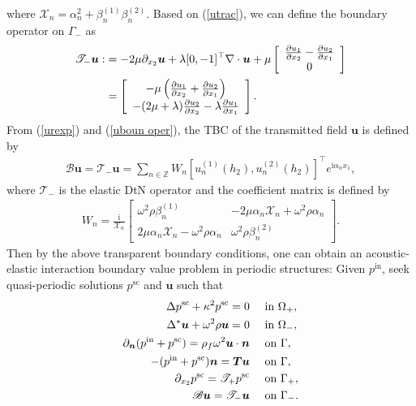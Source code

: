 \documentclass[final,3p,times]{elsarticle}
\begin{document}
where $\mathcal{X}_{n} = \alpha_n^2 + \beta_n^{(1)}\beta_n^{(2)}$. 
Based on (\ref{utrac}), we can define the boundary operator on $\Gamma_-$ as
\begin{align}\label{uboun oper}
	\mathscr{T}_- \boldsymbol{u}:&= -2 \mu \partial_{x_2}\boldsymbol{u}+\lambda [0,-1]^{\top}\nabla \cdot \boldsymbol{u}+\mu \left[\begin{array}{c}\frac{\partial u_1}{\partial x_2}-\frac{\partial u_2}{\partial x_1} \\ 0\end{array}\right] \notag\\
	&=\left[\begin{array}{c}-\mu\left(\frac{\partial u_1}{\partial x_2}+\frac{\partial u_2}{\partial x_1}\right) \\ -(2 \mu+\lambda) \frac{\partial u_2}{\partial x_2}-\lambda \frac{\partial u_1}{\partial x_1}\end{array}\right].
\end{align}
From (\ref{urexp}) and (\ref{uboun oper}),  the TBC of the transmitted field $\boldsymbol{u}$ is defined by
\begin{align}\label{udtn}
	\mathscr{B} \boldsymbol{u}=\mathscr{T}_- \boldsymbol{u}=\sum_{n \in \mathbb{Z}} W_n\left[u_n^{(1)}(h_2), u_n^{(2)}(h_2)\right]^{\top} e^{\mathrm{i} \alpha_n x_1},
\end{align}
where $\mathscr{T}_-$ is the elastic DtN operator and the coefficient matrix is defined by
\begin{align*}
	W_n=\frac{\mathrm{i}}{\mathcal{X}_n}\left[\begin{array}{cc}
		\omega^2 \rho \beta_n^{(1)} & -2 \mu \alpha_n \mathcal{X}_n+\omega^2 \rho \alpha_n \\
		2 \mu \alpha_n \mathcal{X}_n-\omega^2 \rho \alpha_n & \omega^2 \rho \beta_n^{(2)}
	\end{array}\right].
\end{align*}
Then by the above transparent boundary conditions, one can obtain an acoustic-elastic interaction  boundary value problem in periodic structures: Given $p^\mathrm{in}$, seek quasi-periodic solutions $p^\mathrm{sc}$ and $\boldsymbol{u}$ such that
\begin{align}\label{DtNproblem}
	\Delta p^\mathrm{sc}+\kappa^2 p^\mathrm{sc}=0 & \quad\text { in } \Omega_+, \notag\\
	\Delta^* \boldsymbol{u} + \omega^2\rho \boldsymbol{u}=0 & \quad\text { in } \Omega_-, \notag \\
	\partial_{\boldsymbol{n}} (p^\mathrm{in}+p^\mathrm{sc})=\rho_f \omega^2 \boldsymbol{u} \cdot \boldsymbol{n} & \quad\text { on } \Gamma, \notag \\
	-(p^\mathrm{in}+p^\mathrm{sc}) \boldsymbol{n}=\boldsymbol{T} \boldsymbol{u} & \quad\text { on } \Gamma, \\
	\partial_{x_2} p^\mathrm{sc}=\mathscr{T}_+ p^\mathrm{sc} & \quad\text { on } \Gamma_+, \notag\\
	\mathscr{B} \boldsymbol{u}=\mathscr{T}_- \boldsymbol{u} &\quad \text { on } \Gamma_-.\notag
\end{align}
\end{document}
